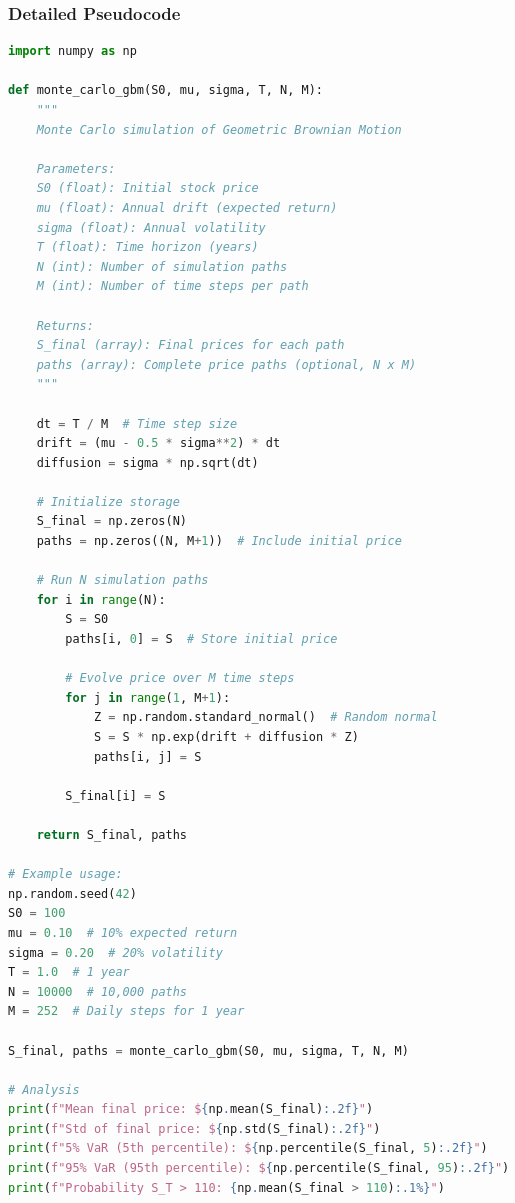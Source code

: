 \documentclass[12pt,a4paper]{article}
\begin{document}
\subsubsection{Detailed Pseudocode}

\begin{lstlisting}[language=Python, caption=Monte Carlo Simulation of GBM]
import numpy as np

def monte_carlo_gbm(S0, mu, sigma, T, N, M):
    """
    Monte Carlo simulation of Geometric Brownian Motion
    
    Parameters:
    S0 (float): Initial stock price
    mu (float): Annual drift (expected return)
    sigma (float): Annual volatility
    T (float): Time horizon (years)
    N (int): Number of simulation paths
    M (int): Number of time steps per path
    
    Returns:
    S_final (array): Final prices for each path
    paths (array): Complete price paths (optional, N x M)
    """
    
    dt = T / M  # Time step size
    drift = (mu - 0.5 * sigma**2) * dt
    diffusion = sigma * np.sqrt(dt)
    
    # Initialize storage
    S_final = np.zeros(N)
    paths = np.zeros((N, M+1))  # Include initial price
    
    # Run N simulation paths
    for i in range(N):
        S = S0
        paths[i, 0] = S  # Store initial price
        
        # Evolve price over M time steps
        for j in range(1, M+1):
            Z = np.random.standard_normal()  # Random normal
            S = S * np.exp(drift + diffusion * Z)
            paths[i, j] = S
        
        S_final[i] = S
    
    return S_final, paths

# Example usage:
np.random.seed(42)
S0 = 100
mu = 0.10  # 10% expected return
sigma = 0.20  # 20% volatility
T = 1.0  # 1 year
N = 10000  # 10,000 paths
M = 252  # Daily steps for 1 year

S_final, paths = monte_carlo_gbm(S0, mu, sigma, T, N, M)

# Analysis
print(f"Mean final price: ${np.mean(S_final):.2f}")
print(f"Std of final price: ${np.std(S_final):.2f}")
print(f"5% VaR (5th percentile): ${np.percentile(S_final, 5):.2f}")
print(f"95% VaR (95th percentile): ${np.percentile(S_final, 95):.2f}")
print(f"Probability S_T > 110: {np.mean(S_final > 110):.1%}")
\end{lstlisting}
\end{document}
